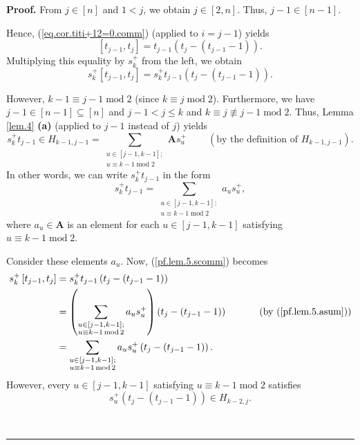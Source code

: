 \documentclass[numbers=enddot,12pt,final,onecolumn,notitlepage]{scrartcl}%
\theoremstyle{definition}
\newenvironment{proof}[1][Proof]{\noindent\textbf{#1.} }{\ \rule{0.5em}{0.5em}}
\let\sumnonlimits\sum
\renewcommand{\sum}{\sumnonlimits\limits}
\begin{document}
\begin{proof}
From $j\in\left[  n\right]  $ and $1<j$, we obtain $j\in\left[  2,n\right]  $.
Thus, $j-1\in\left[  n-1\right]  $.

Hence, (\ref{eq.cor.titi+12=0.comm}) (applied to $i=j-1$) yields%
\begin{equation}
\left[  t_{j-1},t_{j}\right]  =t_{j-1}\left(  t_{j}-\left(  t_{j-1}-1\right)
\right)  . \label{pf.lem.5.comm}%
\end{equation}
Multiplying this equality by $s_{k}^{+}$ from the left, we obtain%
\begin{equation}
s_{k}^{+}\left[  t_{j-1},t_{j}\right]  =s_{k}^{+}t_{j-1}\left(  t_{j}-\left(
t_{j-1}-1\right)  \right)  . \label{pf.lem.5.scomm}%
\end{equation}


However, $k-1\equiv j-1\operatorname{mod}2$ (since $k\equiv
j\operatorname{mod}2$). Furthermore, we have $j-1\in\left[  n-1\right]
\subseteq\left[  n\right]  $ and $j-1<j\leq k$ and $k\equiv j\not \equiv
j-1\operatorname{mod}2$. Thus, Lemma \ref{lem.4} \textbf{(a)} (applied to
$j-1$ instead of $j$) yields%
\[
s_{k}^{+}t_{j-1}\in H_{k-1,j-1}=\sum_{\substack{u\in\left[  j-1,k-1\right]
;\\u\equiv k-1\operatorname{mod}2}}\mathbf{A}s_{u}^{+}%
\ \ \ \ \ \ \ \ \ \ \left(  \text{by the definition of }H_{k-1,j-1}\right)  .
\]
In other words, we can write $s_{k}^{+}t_{j-1}$ in the form%
\begin{equation}
s_{k}^{+}t_{j-1}=\sum_{\substack{u\in\left[  j-1,k-1\right]  ;\\u\equiv
k-1\operatorname{mod}2}}a_{u}s_{u}^{+}, \label{pf.lem.5.asum}%
\end{equation}
where $a_{u}\in\mathbf{A}$ is an element for each $u\in\left[  j-1,k-1\right]
$ satisfying $u\equiv k-1\operatorname{mod}2$.

Consider these elements $a_{u}$. Now, (\ref{pf.lem.5.scomm}) becomes%
\begin{align}
s_{k}^{+}\left[  t_{j-1},t_{j}\right]   &  =s_{k}^{+}t_{j-1}\left(
t_{j}-\left(  t_{j-1}-1\right)  \right) \nonumber\\
&  =\left(  \sum_{\substack{u\in\left[  j-1,k-1\right]  ;\\u\equiv
k-1\operatorname{mod}2}}a_{u}s_{u}^{+}\right)  \left(  t_{j}-\left(
t_{j-1}-1\right)  \right)  \ \ \ \ \ \ \ \ \ \ \left(  \text{by
(\ref{pf.lem.5.asum})}\right) \nonumber\\
&  =\sum_{\substack{u\in\left[  j-1,k-1\right]  ;\\u\equiv
k-1\operatorname{mod}2}}a_{u}s_{u}^{+}\left(  t_{j}-\left(  t_{j-1}-1\right)
\right)  . \label{pf.lem.5.sksum}%
\end{align}
However, every $u\in\left[  j-1,k-1\right]  $ satisfying $u\equiv
k-1\operatorname{mod}2$ satisfies%
\begin{equation}
s_{u}^{+}\left(  t_{j}-\left(  t_{j-1}-1\right)  \right)  \in H_{k-2,j}.
\label{pf.lem.5.p-lem}%
\end{equation}



\end{proof}
\end{document}

